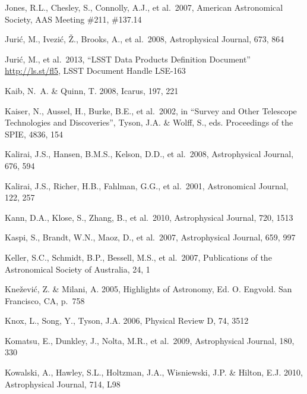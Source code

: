 \documentclass{emulateapj}
\begin{document}
\begin{thebibliography}{}
\bibitem[()]{} Jones, R.L., Chesley, S., Connolly, A.J., et al.~2007, American Astronomical Society, AAS 
             Meeting \#211, \#137.14

\bibitem[()]{} Juri\'{c}, M., Ivezi\'c, \v Z., Brooks, A., et al.~2008, Astrophysical Journal, 673, 864

\bibitem[()]{} Juri\'{c}, M., et al.~2013, ``LSST Data Products Definition Document'' \url{http://ls.st/fl5}, LSST Document Handle LSE-163

\bibitem[()]{} Kaib, N.~A. \& Quinn, T. 2008, Icarus, 197, 221 

\bibitem[()]{} Kaiser, N., Aussel, H., Burke, B.E., et al.~2002, in ``Survey and Other Telescope 
             Technologies and Discoveries'', Tyson, J.A. \& Wolff, S.,
             eds. Proceedings of the SPIE, 4836, 154 

\bibitem[()]{} Kalirai, J.S., Hansen, B.M.S., Kelson, D.D., et al.~2008, Astrophysical Journal, 676, 594

\bibitem[()]{} Kalirai, J.S., Richer, H.B., Fahlman, G.G., et al.~2001, Astronomical Journal, 122, 257
	

\bibitem[()]{} Kann, D.A., Klose, S., Zhang, B., et al.~2010, Astrophysical Journal, 720, 1513 
 

\bibitem[()]{} Kaspi, S., Brandt, W.N., Maoz, D., et al.~2007, Astrophysical Journal, 659, 997

\bibitem[()]{} Keller, S.C., Schmidt, B.P., Bessell, M.S., et al.~2007, Publications of the Astronomical 
             Society of Australia, 24, 1

\bibitem[()]{} Kne\v{z}evi\'{c}, Z. \& Milani, A. 2005, Highlights of Astronomy, Ed. O. Engvold. San 
             Francisco, CA, p.~758

\bibitem[()]{} Knox, L., Song, Y., Tyson, J.A. 2006, Physical Review D, 74, 3512 

\bibitem[()]{} Komatsu, E., Dunkley, J., Nolta, M.R., et al.~2009, Astrophysical Journal, 180, 330 
	

\bibitem[()]{} Kowalski, A., Hawley, S.L., Holtzman, J.A., Wisniewski, J.P. \& Hilton, E.J. 2010, Astrophysical Journal, 714, L98


\end{thebibliography}
\end{document}
